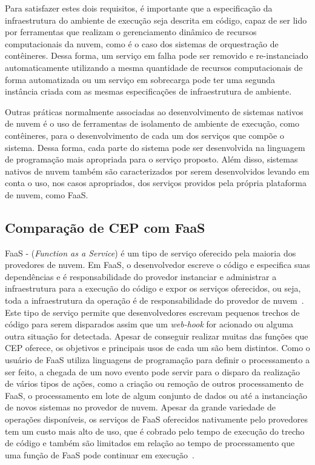 Para satisfazer estes dois requisitos, é importante que a especificação da infraestrutura do ambiente de execução seja descrita em código, capaz de ser lido por ferramentas que realizam o gerenciamento dinâmico de recursos computacionais da nuvem, como é o caso dos sistemas de orquestração de contêineres. Dessa forma, um serviço em falha pode ser removido e re-instanciado automaticamente utilizando a mesma quantidade de recursos computacionais de forma automatizada ou um serviço em sobrecarga pode ter uma segunda instância criada com as mesmas especificações de infraestrutura de ambiente. 

Outras práticas normalmente associadas ao desenvolvimento de sistemas nativos de nuvem é o uso de ferramentas de isolamento de ambiente de execução, como contêineres, para o desenvolvimento de cada um dos serviços que compõe o sistema. Dessa forma, cada parte do sistema pode ser desenvolvida na linguagem de programação mais apropriada para o serviço proposto. Além disso, sistemas nativos de nuvem também são caracterizados por serem desenvolvidos levando em conta o uso, nos casos apropriados, dos serviços providos pela própria plataforma de nuvem, como FaaS.

\subsection{Comparação de CEP com FaaS}
\label{sub-sec:Faas}
FaaS - (\textit{Function as a Service}) é um tipo de serviço oferecido pela maioria dos provedores de nuvem. Em FaaS, o desenvolvedor escreve o código e especifica suas dependências e é responsabilidade do provedor instanciar e administrar a infraestrutura para a execução do código e expor os serviços oferecidos, ou seja, toda a infraestrutura da operação é de responsabilidade do provedor de nuvem~\citep{garrison2017cloud}. Este tipo de serviço permite que desenvolvedores escrevam pequenos trechos de código para serem disparados assim que um \textit{web-hook} for acionado ou alguma outra situação for detectada. Apesar de conseguir realizar muitas das funções que CEP oferece, os objetivos e principais usos de cada um são bem distintos. Como o usuário de FaaS utiliza linguagens de programação para definir o processamento a ser feito, a chegada de um novo evento pode servir para o disparo da realização de vários tipos de ações, como a criação ou remoção de outros processamento de FaaS, o processamento em lote de algum conjunto de dados ou até a instanciação de novos sistemas no provedor de nuvem. Apesar da grande variedade de operações disponíveis, os serviços de FaaS oferecidos nativamente pelo provedores tem um custo mais alto de uso, que é cobrado pelo tempo de execução do trecho de código e também são limitados em relação ao tempo de processamento que uma função de FaaS pode continuar em execução~\citep{AWSLambda,AzureCloudServices,GoogleAppEngine}.

